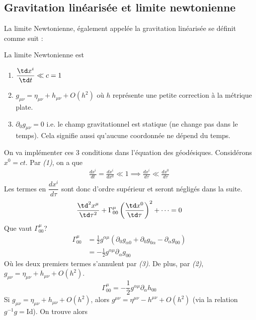 \subsection{Gravitation linéarisée et limite newtonienne}
La limite Newtonienne, également appelée la gravitation linéarisée se définit comme suit :
\begin{theoremframe}
    \begin{defi} 
    La limite Newtonienne est
    \begin{enumerate}
        \item $\dfrac{\td x^{i}}{\td t} \ll c = 1$
        \item $g_{\mu \nu} = \eta_{\mu \nu} + h_{\mu \nu} + O(h^2)$ où $h$ représente une petite correction à la métrique plate. 
        \item $\partial_0 g_{\mu \nu} = 0$ i.e. le champ gravitationnel est statique (ne change pas dans le temps). Cela signifie aussi qu'aucune coordonnée ne dépend du temps. 
    \end{enumerate}
    \end{defi}
\end{theoremframe}
On va implémenter ces 3 conditions dans l'équation des géodésiques. Considérons $x^0 = ct$. Par \textit{(1)}, on a que 
\begin{align}
    \frac{dx^{i}}{dt} = \frac{dx^{i}}{dx^0} \ll 1 \implies \frac{dx^{i}}{d\tau} \ll \frac{dx^{0}}{d\tau}
\end{align}
Les termes en $\dfrac{dx^{i}}{d\tau}$ sont donc d'ordre supérieur et seront négligés dans la suite.
\begin{equation}
     \frac{\td ^2x^{\mu}}{\td \tau^2} + \Gamma^{\mu}_{0 0}\left(\frac{\td x^{0}}{\td \tau}\right)^2 +\dots = 0
\end{equation}
Que vaut $\Gamma^{\mu}_{0 0}$?
\begin{align}
    \Gamma^{\mu}_{0 0} &= \frac{1}{2}g^{\alpha \mu}(\partial_0 g_{\alpha 0} + \partial_{0}g_{0\alpha} - \partial_{\alpha}g_{00})\\
    &= -\frac{1}{2}g^{\alpha \mu}\partial_{\alpha}g_{00}
\end{align}
Où les deux premiers termes s'annulent par \textit{(3)}. 
De plus, par \textit{(2)}, $g_{\mu \nu} = \eta_{\mu \nu} + h_{\mu \nu} + O(h^2)$.
\begin{equation}
    \Gamma^{\mu}_{0 0} =-\frac{1}{2}g^{\alpha \mu}\partial_{\alpha}h_{00}
\end{equation}
Si $g_{\mu \nu} = \eta_{\mu \nu} + h_{\mu \nu} +O(h^2)$, alors $g^{\mu \nu} = \eta^{\mu \nu} - h^{\mu \nu } +O(h^2)$ (via la relation $g^{-1} g = \mathrm{Id}$). On trouve alors
